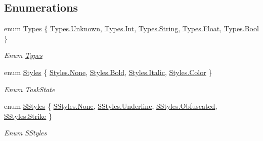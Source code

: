 \subsection*{Enumerations}
\begin{DoxyCompactItemize}
\item 
enum \hyperlink{namespace_lerp2_a_p_i_1_1_game_a2f182da062f210cc43f341f6992ee293}{Types} \{ \newline
\hyperlink{namespace_lerp2_a_p_i_1_1_game_a2f182da062f210cc43f341f6992ee293a88183b946cc5f0e8c96b2e66e1c74a7e}{Types.\+Unknown}, 
\hyperlink{namespace_lerp2_a_p_i_1_1_game_a2f182da062f210cc43f341f6992ee293a1686a6c336b71b36d77354cea19a8b52}{Types.\+Int}, 
\hyperlink{namespace_lerp2_a_p_i_1_1_game_a2f182da062f210cc43f341f6992ee293a27118326006d3829667a400ad23d5d98}{Types.\+String}, 
\hyperlink{namespace_lerp2_a_p_i_1_1_game_a2f182da062f210cc43f341f6992ee293a22ae0e2b89e5e3d477f988cc36d3272b}{Types.\+Float}, 
\newline
\hyperlink{namespace_lerp2_a_p_i_1_1_game_a2f182da062f210cc43f341f6992ee293ac26f15e86e3de4c398a8273272aba034}{Types.\+Bool}
 \}\begin{DoxyCompactList}\small\item\em Enum \hyperlink{class_types}{Types} \end{DoxyCompactList}
\item 
enum \hyperlink{namespace_lerp2_a_p_i_1_1_game_a44d264926b1618bd77ec2c974e7113b7}{Styles} \{ \hyperlink{namespace_lerp2_a_p_i_1_1_game_a44d264926b1618bd77ec2c974e7113b7a6adf97f83acf6453d4a6a4b1070f3754}{Styles.\+None}, 
\hyperlink{namespace_lerp2_a_p_i_1_1_game_a44d264926b1618bd77ec2c974e7113b7a114c3050111d8b8ddd830b99ccebd246}{Styles.\+Bold}, 
\hyperlink{namespace_lerp2_a_p_i_1_1_game_a44d264926b1618bd77ec2c974e7113b7a1d874710ccdcd46b95397049d2e7500c}{Styles.\+Italic}, 
\hyperlink{namespace_lerp2_a_p_i_1_1_game_a44d264926b1618bd77ec2c974e7113b7acb5feb1b7314637725a2e73bdc9f7295}{Styles.\+Color}
 \}\begin{DoxyCompactList}\small\item\em Enum Task\+State \end{DoxyCompactList}
\item 
enum \hyperlink{namespace_lerp2_a_p_i_1_1_game_a40a896b145d802bb883b777ab7413d7b}{S\+Styles} \{ \hyperlink{namespace_lerp2_a_p_i_1_1_game_a40a896b145d802bb883b777ab7413d7ba6adf97f83acf6453d4a6a4b1070f3754}{S\+Styles.\+None}, 
\hyperlink{namespace_lerp2_a_p_i_1_1_game_a40a896b145d802bb883b777ab7413d7ba852721aa5fc738dfedff2945d71da439}{S\+Styles.\+Underline}, 
\hyperlink{namespace_lerp2_a_p_i_1_1_game_a40a896b145d802bb883b777ab7413d7ba7357cf5161efbf8c4d5d0c30b4815ee2}{S\+Styles.\+Obfuscated}, 
\hyperlink{namespace_lerp2_a_p_i_1_1_game_a40a896b145d802bb883b777ab7413d7ba861bb8830b30ae92120225676fe880bb}{S\+Styles.\+Strike}
 \}\begin{DoxyCompactList}\small\item\em Enum S\+Styles \end{DoxyCompactList}
\end{DoxyCompactItemize}


